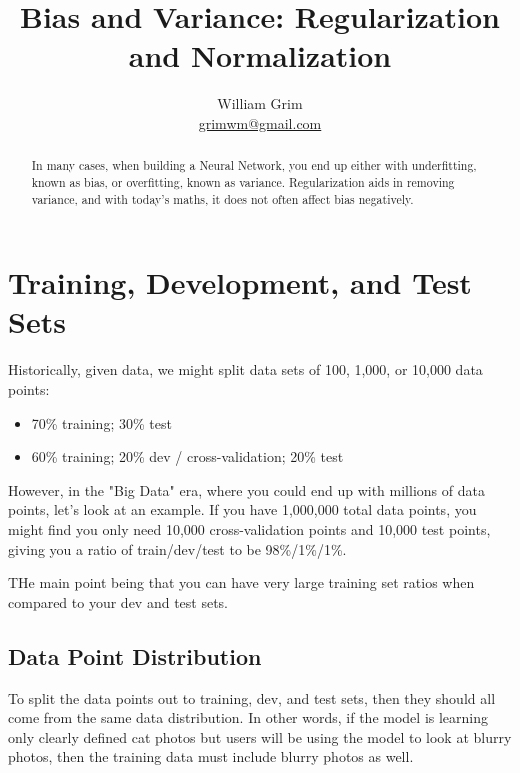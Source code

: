 \documentclass{article}
\begin{document}
\title {Bias and Variance: Regularization and Normalization}
\author{William Grim \\ \href{mailto:grimwm@gmail.com}{grimwm@gmail.com}}

\maketitle

\tableofcontents

\begin{abstract}
In many cases, when building a Neural Network, you end up either with underfitting, known as bias, or overfitting, known as variance.  Regularization aids in removing variance, and with today's maths, it does not often affect bias negatively.
\end{abstract}

\section{Training, Development, and Test Sets}

Historically, given data, we might split data sets of 100, 1,000, or 10,000 data points:

\begin{itemize}
\item 70\% training; 30\% test
\item 60\% training; 20\% dev / cross-validation; 20\% test
\end{itemize}

However, in the "Big Data" era, where you could end up with millions of data points, let's look at an example.  If you have 1,000,000 total data points, you might find you only need 10,000 cross-validation points and 10,000 test points, giving you a ratio of train/dev/test to be 98\%/1\%/1\%.

THe main point being that you can have very large training set ratios when compared to your dev and test sets.

\subsection{Data Point Distribution}

To split the data points out to training, dev, and test sets, then they should all come from the same data distribution.  In other words, if the model is learning only clearly defined cat photos but users will be using the model to look at blurry photos, then the training data must include blurry photos as well.
\end{document}
